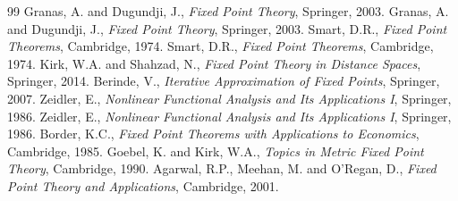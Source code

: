 \documentclass[12pt,a4paper,twoside]{book}
\theoremstyle{definition}
\theoremstyle{plain}
\theoremstyle{remark}
\begin{document}
\backmatter
\begin{thebibliography}{99}
 Granas, A. and Dugundji, J., \emph{Fixed Point Theory}, Springer, 2003.
 Granas, A. and Dugundji, J., \emph{Fixed Point Theory}, Springer, 2003.
 Smart, D.R., \emph{Fixed Point Theorems}, Cambridge, 1974.
 Smart, D.R., \emph{Fixed Point Theorems}, Cambridge, 1974.
 Kirk, W.A. and Shahzad, N., \emph{Fixed Point Theory in Distance Spaces}, Springer, 2014.
 Berinde, V., \emph{Iterative Approximation of Fixed Points}, Springer, 2007.
 Zeidler, E., \emph{Nonlinear Functional Analysis and Its Applications I}, Springer, 1986.
 Zeidler, E., \emph{Nonlinear Functional Analysis and Its Applications I}, Springer, 1986.
 Border, K.C., \emph{Fixed Point Theorems with Applications to Economics}, Cambridge, 1985.
 Goebel, K. and Kirk, W.A., \emph{Topics in Metric Fixed Point Theory}, Cambridge, 1990.
 Agarwal, R.P., Meehan, M. and O'Regan, D., \emph{Fixed Point Theory and Applications}, Cambridge, 2001.
\end{thebibliography}
\printindex
\end{document}
